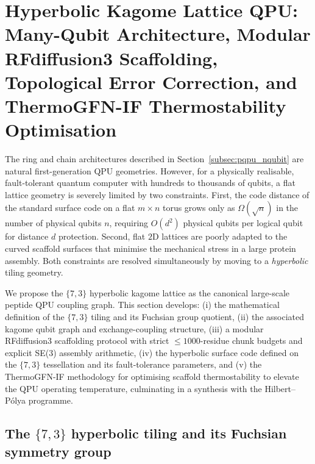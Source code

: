 \documentclass[11pt,oneside]{amsbook}
\numberwithin{equation}{section}
\theoremstyle{plain}
\theoremstyle{definition}
\theoremstyle{remark}
\begin{document}

\section[Hyperbolic Kagome Lattice QPU]{Hyperbolic Kagome Lattice QPU: Many-Qubit Architecture, Modular
  RFdiffusion3 Scaffolding, Topological Error Correction,
  and ThermoGFN-IF Thermostability Optimisation}
\label{sec:hyperbolic_kagome}

The ring and chain architectures described in
Section~\ref{subsec:pqpu_nqubit} are natural first-generation QPU geometries.
However, for a physically realisable, fault-tolerant quantum computer with
hundreds to thousands of qubits, a flat lattice geometry is severely
limited by two constraints.  First, the code distance of the standard surface
code on a flat $m\times n$ torus grows only as $\Omega(\sqrt{n})$ in the
number of physical qubits $n$, requiring $O(d^2)$ physical qubits per logical
qubit for distance $d$ protection.  Second, flat $2$D lattices are poorly
adapted to the curved scaffold surfaces that minimise the mechanical stress in
a large protein assembly.  Both constraints are resolved simultaneously by
moving to a \emph{hyperbolic} tiling geometry.

We propose the $\{7,3\}$ hyperbolic kagome lattice as the canonical large-scale
peptide QPU coupling graph.  This section develops: (i) the
mathematical definition of the $\{7,3\}$ tiling and its Fuchsian group
quotient, (ii) the associated kagome qubit graph and exchange-coupling
structure, (iii) a modular RFdiffusion3 scaffolding protocol with strict
$\le 1000$-residue chunk budgets and explicit SE(3) assembly arithmetic,
(iv) the hyperbolic surface code defined on the $\{7,3\}$ tessellation and
its fault-tolerance parameters, and (v) the ThermoGFN-IF methodology for
optimising scaffold thermostability to elevate the QPU operating temperature,
culminating in a synthesis with the Hilbert--P\'olya programme.

\subsection{The $\{7,3\}$ hyperbolic tiling and its Fuchsian symmetry group}
\label{subsec:hk_tiling}
\end{document}
